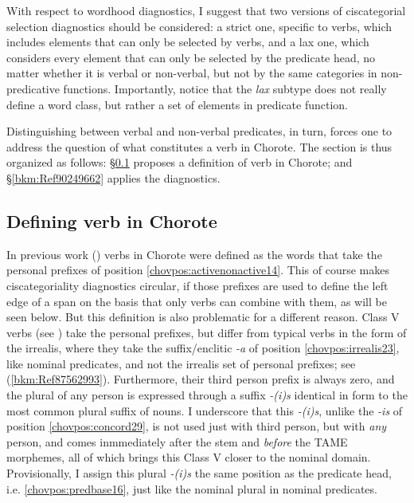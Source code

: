 \documentclass[output=paper]{langscibook}
\begin{document}
With respect to wordhood diagnostics, I suggest that two versions of ciscategorial selection diagnostics should be considered: a strict one, specific to verbs, which includes elements that can only be selected by verbs, and a lax one, which considers every element that can only be selected by the predicate head, no matter whether it is verbal or non-verbal, but not by the same categories in non-predicative functions. Importantly, notice that the \textit{lax} subtype does not really define a word class, but rather a set of elements in predicate function.

Distinguishing between verbal and non-verbal predicates, in turn, forces one to address the question of what constitutes a verb in Chorote. The section is thus organized as follows: §\ref{bkm:Ref87562721} proposes a definition of verb in Chorote; and §\ref{bkm:Ref90249662} applies the diagnostics.

\subsection{Defining verb in Chorote}
\label{bkm:Ref87562721}
In previous work (\citealt{Carol2013, Carol2014}) verbs in Chorote were defined as the words that take the personal prefixes of position \ref{chovpos:activenonactive14}. This of course makes ciscategoriality diagnostics circular, if those prefixes are used to define the left edge of a span on the basis that only verbs can combine with them, as will be seen below. But this definition is also problematic for a different reason. Class V verbs (see ) take the personal prefixes, but differ from typical verbs in the form of the irrealis, where they take the suffix/enclitic \textit{-a} of position \ref{chovpos:irrealis23}, like nominal predicates, and not the irrealis set of personal prefixes; see (\ref{bkm:Ref87562993}). Furthermore, their third person prefix is always zero, and the plural of any person is expressed through a suffix \textit{-(i)s} identical in form to the most common plural suffix of nouns. I underscore that this \textit{-(i)s}, unlike the \textit{-is} of position \ref{chovpos:concord29}, is not used just with third person, but with \textit{any} person, and comes inmmediately after the stem and \textit{before} the TAME morphemes, all of which brings this Class V closer to the nominal domain. Provisionally, I assign this plural \textit{-(i)s} the same position as the predicate head, i.e. \ref{chovpos:predbase16}, just like the nominal plural in nominal predicates.
\end{document}

